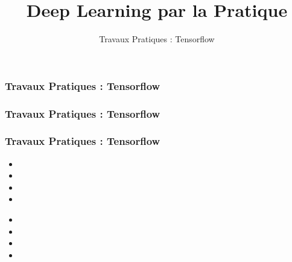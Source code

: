 \documentclass{formation}
\title{Deep Learning par la Pratique}
\subtitle{Travaux Pratiques : Tensorflow }
\begin{document}
\maketitle

\begin{frame}
  \frametitle{Travaux Pratiques : Tensorflow }
\end{frame}

\begin{frame}
  \frametitle{Travaux Pratiques : Tensorflow }
\end{frame}

\begin{frame}
  \frametitle{Travaux Pratiques : Tensorflow }

  
  \begin{itemize}
  \item 
  \item 
  \item 
  \item 
  \end{itemize}

  \begin{minipage}[l]{0.49\linewidth}
  \end{minipage}\hfill
  \begin{minipage}[l]{0.49\linewidth}
  \end{minipage}\hfill

  \begin{minipage}[l]{0.49\linewidth}
      \begin{itemize}
      \item 
      \item 
      \item 
      \item 
      \end{itemize}
  \end{minipage}\hfill
  \begin{minipage}[l]{0.49\linewidth}
  \end{minipage}\hfill

\end{frame}
\end{document}
